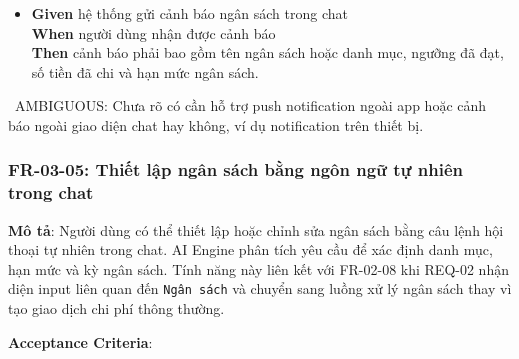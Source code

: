 \begin{itemize}
\item \textbf{Given} hệ thống gửi cảnh báo ngân sách trong chat  \\ \hspace*{1.5em}  \textbf{When} người dùng nhận được cảnh báo  \\ \hspace*{1.5em}  \textbf{Then} cảnh báo phải bao gồm tên ngân sách hoặc danh mục, ngưỡng đã đạt, số tiền đã chi và hạn mức ngân sách.
\end{itemize}
\warningicon\  AMBIGUOUS: Chưa rõ có cần hỗ trợ push notification ngoài app hoặc cảnh báo ngoài giao diện chat hay không, ví dụ notification trên thiết bị.



\subsubsection{FR-03-05: Thiết lập ngân sách bằng ngôn ngữ tự nhiên trong chat}

\textbf{Mô tả}: Người dùng có thể thiết lập hoặc chỉnh sửa ngân sách bằng câu lệnh hội thoại tự nhiên trong chat. AI Engine phân tích yêu cầu để xác định danh mục, hạn mức và kỳ ngân sách. Tính năng này liên kết với FR-02-08 khi REQ-02 nhận diện input liên quan đến \texttt{Ngân sách} và chuyển sang luồng xử lý ngân sách thay vì tạo giao dịch chi phí thông thường.



\textbf{Acceptance Criteria}:

